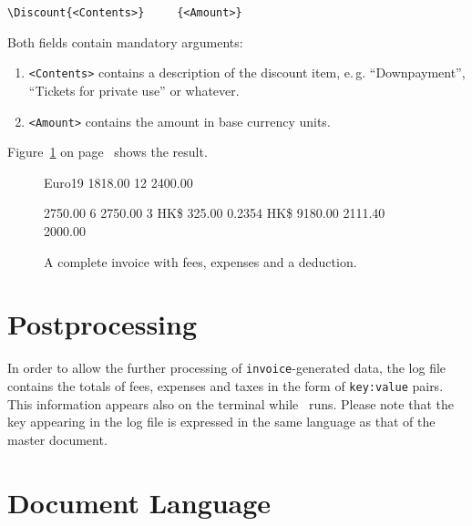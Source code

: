 \documentclass[11pt]{ltxdoc}
\begin{document}
\begin{verbatim}
\Discount{<Contents>}     {<Amount>}
\end{verbatim}

Both fields contain mandatory arguments:

\begin{enumerate}
	\item \texttt{<Contents>} contains a description of the
		discount item, e.\,g. ``Downpayment'', ``Tickets for 
		private use'' or whatever.
	\item \texttt{<Amount>} contains the amount in base currency
		units.
\end{enumerate}

Figure~\ref{full_and_discounted_invoice} on
page~\pageref{full_and_discounted_invoice}
shows the result.

\begin{figure}[h]
\begin{invoice}{Euro}{19}
			{1818.00}	{12}
       		{2400.00}

          {2750.00}   { 6}
           {2750.00}   { 3}
        {HK\$}  {325.00} {0.2354}   {}
              {HK\$}  {9180.00}   {} {2111.40}
         {2000.00}
\end{invoice}
\caption{A complete invoice with fees,
		expenses and a deduction.\label{full_and_discounted_invoice}}
\end{figure}

\section{Postprocessing}

In order to allow the further processing of
\texttt{invoice}-generated data, the log file contains the totals of
fees, expenses and taxes in the form of \verb-key:value- pairs. This
information appears also on the terminal while \LaTeXe\ runs. Please
note that the key appearing in the log file is expressed in the same
language as that of the master document.

\section{Document Language}
\end{document}
